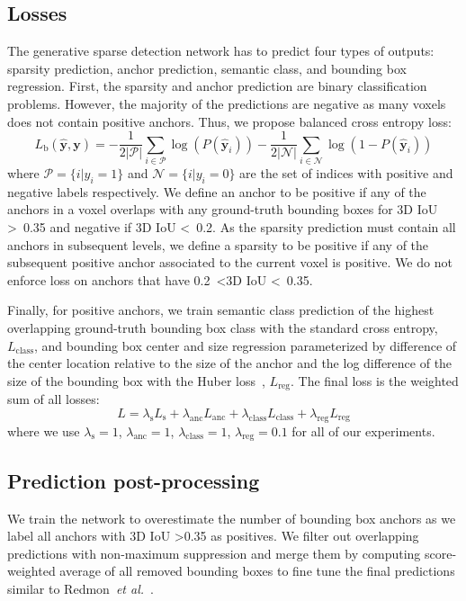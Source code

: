 \documentclass[runningheads]{llncs}
\newcommand{\etal}{\textit{et al.}}
\begin{document}
\subsection{Losses}
The generative sparse detection network has to predict four types of outputs: sparsity prediction, anchor prediction, semantic class, and bounding box regression.
First, the sparsity and anchor prediction are binary classification problems. However, the majority of the predictions are negative as many voxels does not contain positive anchors. Thus, we propose balanced cross entropy loss:
$$
L_\textrm{b}(\hat{\textbf{y}}, \textbf{y}) = - \frac{1}{2|\mathcal{P}|} \sum_{i \in \mathcal{P}} \log(P(\hat{\mathbf{y}}_i)) - \frac{1}{2|\mathcal{N}|}\sum_{i \in \mathcal{N}} \log(1 - P(\hat{\mathbf{y}}_i))
$$
where $\mathcal{P} = \{i | y_i = 1\}$ and $\mathcal{N} = \{i | y_i = 0\}$ are the set of indices with positive and negative labels respectively.
We define an anchor to be positive if any of the anchors in a voxel overlaps with any ground-truth bounding boxes for 3D IoU \textgreater~0.35 and negative if 3D IoU \textless~0.2. As the sparsity prediction must contain all anchors in subsequent levels, we define a sparsity to be positive if any of the subsequent positive anchor associated to the current voxel is positive. We do not enforce loss on anchors that have 0.2~\textless 3D IoU \textless~0.35.





Finally, for positive anchors, we train semantic class prediction of the highest overlapping ground-truth bounding box class with the standard cross entropy, $L_\text{class}$, and bounding box center and size regression parameterized by difference of the center location relative to the size of the anchor and the log difference of the size of the bounding box with the Huber loss~\cite{ren2015faster}, $L_\text{reg}$. The final loss is the weighted sum of all losses:
$$
L = \lambda_{\text{s}}L_{\text{s}}
+ \lambda_{\text{anc}}L_{\text{anc}}
+ \lambda_{\text{class}}L_{\text{class}}
+ \lambda_{\text{reg}}L_{\text{reg}}
$$
where we use $\lambda_{\text{s}}=1$, $\lambda_{\text{anc}}=1$, $\lambda_{\text{class}}=1$, $\lambda_{\text{reg}}=0.1$ for all of our experiments.





\subsection{Prediction post-processing}
We train the network to overestimate the number of bounding box anchors as we label all anchors with 3D IoU \textgreater 0.35 as positives. We filter out overlapping predictions with non-maximum suppression and merge them by computing score-weighted average of all removed bounding boxes to fine tune the final predictions similar to Redmon~\etal~\cite{redmon2017yolo9000}.
\end{document}
